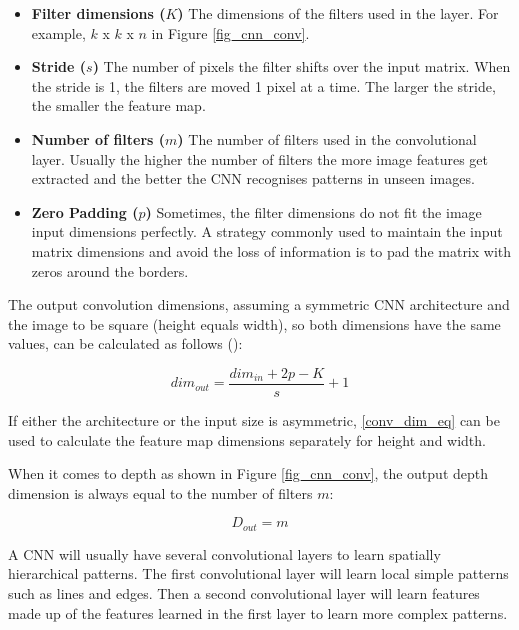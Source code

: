 \begin{itemize}
    \item \textbf{Filter dimensions ($K$)} The dimensions of the filters used in the layer. For example, $k$ x $k$ x $n$ in Figure \ref{fig_cnn_conv}.
    \item \textbf{Stride ($s$)} The number of pixels the filter shifts over the input matrix. When the stride is 1, the filters are moved 1 pixel at a time. The larger the stride, the smaller the feature map.
    \item \textbf{Number of filters ($m$)} The number of filters used in the convolutional layer. Usually the higher the number of filters the more image features get extracted and the better the \gls{CNN} recognises patterns in unseen images.
    \item \textbf{Zero Padding ($p$)} Sometimes, the filter dimensions do not fit the image input dimensions perfectly. A strategy commonly used to maintain the input matrix dimensions and avoid the loss of information is to pad the matrix with zeros around the borders.
\end{itemize}
  
The output convolution dimensions, assuming a symmetric \gls{CNN} architecture and the image to be square (height equals width), so both dimensions have the same values, can be calculated as follows (\cite{dumoulin2018guide}):

\begin{equation}
    \label{conv_dim_eq}
    dim_{out} = \frac{dim_{in} + 2p - K}{s} + 1
\end{equation}

If either the architecture or the input size is asymmetric, \ref{conv_dim_eq} can be used to calculate the feature map dimensions separately for height and width.

When it comes to depth as shown in Figure \ref{fig_cnn_conv}, the output depth dimension is always equal to the number of filters $m$:

\begin{equation}
    \label{conv_depth_eq}
    D_{out} = m
\end{equation}

A \gls{CNN} will usually have several convolutional layers to learn spatially hierarchical patterns. The first convolutional layer will learn local simple patterns such as lines and edges. Then a second convolutional layer will learn features made up of the features learned in the first layer to learn more complex patterns. 

